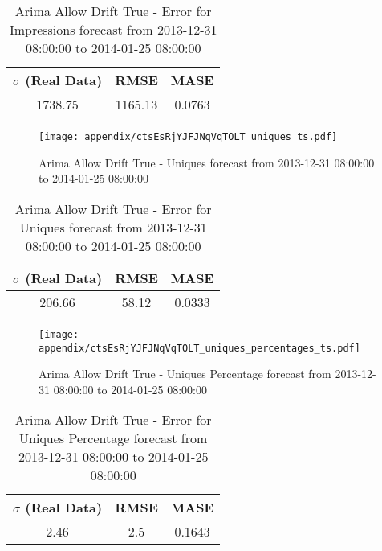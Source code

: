 \begin{table}[H]
\centering
\footnotesize
\begin{tabular}{ccc}
$\sigma$ (Real Data) & RMSE & MASE   \\ \hline
1738.75 & 1165.13 & 0.0763 \\
\end{tabular}

\vspace{0.5cm}

\caption[]{
Arima Allow Drift True - Error for Impressions forecast from 2013-12-31 08:00:00 to 2014-01-25 08:00:00}
\end{table}

\begin{figure}[H] \begin{center} \leavevmode
\texttt{[image: appendix/ctsEsRjYJFJNqVqTOLT\_uniques\_ts.pdf]} \caption[]{
Arima Allow Drift True - Uniques forecast from 2013-12-31 08:00:00 to 2014-01-25 08:00:00} \label{fig:appendix/ctsEsRjYJFJNqVqTOLT_uniques_ts.pdf} \end{center}
\end{figure}

\begin{table}[H]
\centering
\footnotesize
\begin{tabular}{ccc}
$\sigma$ (Real Data) & RMSE & MASE   \\ \hline
206.66 & 58.12 & 0.0333 \\
\end{tabular}

\vspace{0.5cm}

\caption[]{
Arima Allow Drift True - Error for Uniques forecast from 2013-12-31 08:00:00 to 2014-01-25 08:00:00}
\end{table}

\begin{figure}[H] \begin{center} \leavevmode
\texttt{[image: appendix/ctsEsRjYJFJNqVqTOLT\_uniques\_percentages\_ts.pdf]} \caption[]{
Arima Allow Drift True - Uniques Percentage forecast from 2013-12-31 08:00:00 to 2014-01-25 08:00:00} \label{fig:appendix/ctsEsRjYJFJNqVqTOLT_uniques_percentages_ts.pdf} \end{center}
\end{figure}

\begin{table}[H]
\centering
\footnotesize
\begin{tabular}{ccc}
$\sigma$ (Real Data) & RMSE & MASE   \\ \hline
2.46 & 2.5 & 0.1643 \\
\end{tabular}

\vspace{0.5cm}

\caption[]{
Arima Allow Drift True - Error for Uniques Percentage forecast from 2013-12-31 08:00:00 to 2014-01-25 08:00:00}
\end{table}

